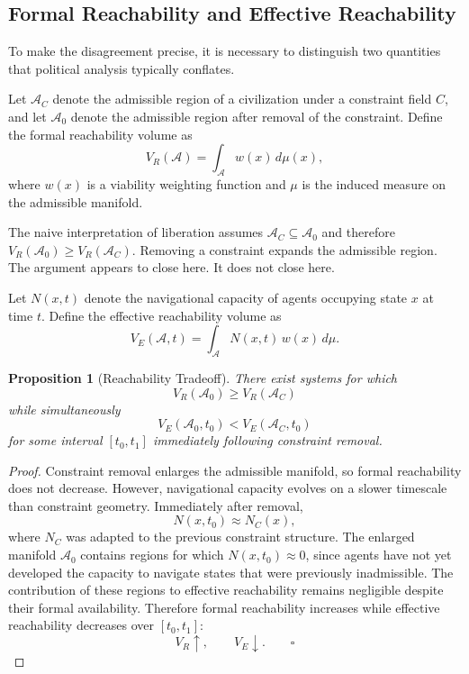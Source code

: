 \documentclass[12pt, a4paper]{article}
\theoremstyle{plain}
\newtheorem{proposition}[theorem]{Proposition}
\theoremstyle{definition}
\theoremstyle{remark}
\begin{document}
\subsection{Formal Reachability and Effective Reachability}

To make the disagreement precise, it is necessary
to distinguish two quantities that political
analysis typically conflates.

Let $\mathcal{A}_C$ denote the admissible region
of a civilization under a constraint field $C$,
and let $\mathcal{A}_0$ denote the admissible
region after removal of the constraint. Define
the formal reachability volume as
\[
V_R(\mathcal{A}) = \int_{\mathcal{A}} w(x)\, d\mu(x),
\]
where $w(x)$ is a viability weighting function
and $\mu$ is the induced measure on the admissible
manifold.

The naive interpretation of liberation assumes
$\mathcal{A}_C \subseteq \mathcal{A}_0$ and
therefore $V_R(\mathcal{A}_0) \geq
V_R(\mathcal{A}_C)$. Removing a constraint
expands the admissible region. The argument
appears to close here. It does not close here.

Let $N(x,t)$ denote the navigational capacity
of agents occupying state $x$ at time $t$.
Define the effective reachability volume as
\[
V_E(\mathcal{A},t) =
\int_{\mathcal{A}} N(x,t)\, w(x)\, d\mu.
\]

\begin{proposition}[Reachability Tradeoff]
\label{prop:tradeoff}
There exist systems for which
\[
V_R(\mathcal{A}_0) \geq V_R(\mathcal{A}_C)
\]
while simultaneously
\[
V_E(\mathcal{A}_0, t_0) < V_E(\mathcal{A}_C, t_0)
\]
for some interval $[t_0, t_1]$ immediately
following constraint removal.
\end{proposition}

\begin{proof}
Constraint removal enlarges the admissible
manifold, so formal reachability does not
decrease. However, navigational capacity evolves
on a slower timescale than constraint geometry.
Immediately after removal,
\[
N(x, t_0) \approx N_C(x),
\]
where $N_C$ was adapted to the previous constraint
structure. The enlarged manifold $\mathcal{A}_0$
contains regions for which $N(x, t_0) \approx 0$,
since agents have not yet developed the capacity
to navigate states that were previously inadmissible.
The contribution of these regions to effective
reachability remains negligible despite their
formal availability. Therefore formal reachability
increases while effective reachability decreases
over $[t_0, t_1]$:
\[
V_R \uparrow, \qquad V_E \downarrow. \qquad \square
\]
\end{proof}
\end{document}
